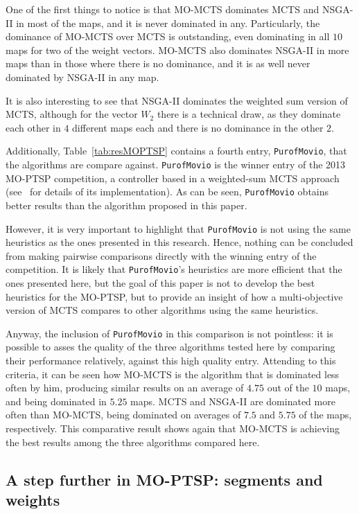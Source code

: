 \documentclass[journal]{IEEEtran}
\begin{document}
One of the first things to notice is that MO-MCTS dominates MCTS and NSGA-II in most of the maps, and it is never dominated in any. Particularly, the dominance of MO-MCTS over MCTS is outstanding, even dominating in all $10$ maps for two of the weight vectors. MO-MCTS also dominates NSGA-II in more maps than in those where there is no dominance, and it is as well never dominated by NSGA-II in any map. 

It is also interesting to see that NSGA-II dominates the weighted sum version of MCTS, although for the vector $W_2$ there is a technical draw, as they dominate each other in $4$ different maps each and there is no dominance in the other $2$.

Additionally, Table~\ref{tab:resMOPTSP} contains a fourth entry, \texttt{PurofMovio}, that the algorithms are compare against. \texttt{PurofMovio} is the winner entry of the 2013 MO-PTSP competition, a controller based in a weighted-sum MCTS approach (see~\cite{Powley2013} for details of its implementation). As can be seen, \texttt{PurofMovio} obtains better results than the algorithm proposed in this paper.

However, it is very important to highlight that \texttt{PurofMovio} is not using the same heuristics as the ones presented in this research. Hence, nothing can be concluded from making pairwise comparisons directly with the winning entry of the competition. It is likely that \texttt{PurofMovio}'s heuristics are more efficient that the ones presented here, but the goal of this paper is not to develop the best heuristics for the MO-PTSP, but to provide an insight of how a multi-objective version of MCTS compares to other algorithms using the same heuristics.

Anyway, the inclusion of \texttt{PurofMovio} in this comparison is not pointless: it is possible to asses the quality of the three algorithms tested here by comparing their performance relatively, against this high quality entry. Attending to this criteria, it can be seen how MO-MCTS is the algorithm that is dominated less often by him, producing similar results on an average of $4.75$ out of the $10$ maps, and being dominated in $5.25$ maps. MCTS and NSGA-II are dominated more often than MO-MCTS, being dominated on averages of $7.5$ and $5.75$ of the maps, respectively. This comparative result shows again that MO-MCTS is achieving the best results among the three algorithms compared here.

\subsection{A step further in MO-PTSP: segments and weights} \label{ssec:resVarW}
\end{document}
